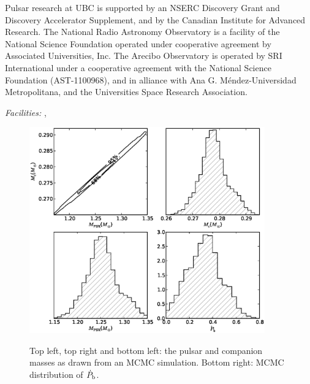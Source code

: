 \documentclass[12pt,preprint]{aastex}
\begin{document}




\acknowledgements
Pulsar research at UBC is supported by an NSERC Discovery Grant and Discovery
Accelerator Supplement, and by the Canadian Institute for Advanced Research.
The National Radio Astronomy Observatory is a facility of the National Science
Foundation operated under cooperative agreement by Associated Universities,
Inc.
The Arecibo Observatory is operated by SRI International under a cooperative
agreement with the National Science Foundation (AST-1100968), and in alliance
with Ana G. Méndez-Universidad Metropolitana, and the Universities Space
Research Association.

{\it Facilities:}
, 

%



\begin{figure}
\includegraphics[width=4in]{masses.eps} \\ 
\caption {\label{fig:mass} Top left, top right and bottom left: the
  pulsar and companion masses as drawn from an MCMC simulation. Bottom right: MCMC distribution of $\dot{P}_{\rm b}$.} 
\end{figure} 
\end{document}
